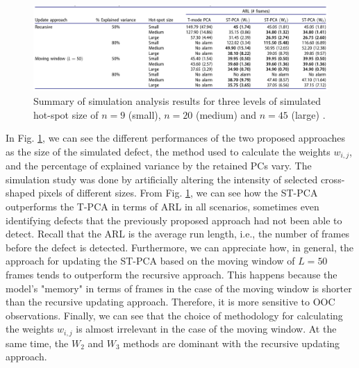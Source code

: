\begin{figure}
    \centering
    \includegraphics[width = \textwidth]{Images/firstcomp.png}
    \caption[ST-PCA simulation analysis results.]{Summary of simulation analysis results for three levels of simulated hot-spot size of $n=9$ (small), $n=20$ (medium) and $n=45$ (large) \cite{colosimo_spatially_2018}.}
    \label{fig:primocomparison}
\end{figure}
In Fig. \ref{fig:primocomparison}, we can see the different performances of the two proposed approaches as the size of the simulated defect, the method used to calculate the weights $w_{i, j}$, and the percentage of explained variance by the retained PCs vary. The simulation study was done by artificially altering the intensity of selected cross-shaped pixels of different sizes. From Fig. \ref{fig:primocomparison}, we can see how the ST-PCA outperforms the T-PCA in terms of ARL in all scenarios, sometimes even identifying defects that the previously proposed approach had not been able to detect. Recall that the ARL is the average run length, i.e., the number of frames before the defect is detected. Furthermore, we can appreciate how, in general, the approach for updating the ST-PCA based on the moving window of $L=50$ frames tends to outperform the recursive approach. This happens because the model's "memory" in terms of frames in the case of the moving window is shorter than the recursive updating approach. Therefore, it is more sensitive to OOC observations. Finally, we can see that the choice of methodology for calculating the weights $w_{i,j}$ is almost irrelevant in the case of the moving window. At the same time, the $W_2$ and $W_3$ methods are dominant with the recursive updating approach.

